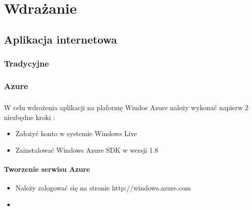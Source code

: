 \chapter{Wdrażanie} %
\label{cha:wdra_anie}

\section{Aplikacja internetowa} %
\label{sec:aplikacja_internetowa}

\subsection{Tradycyjne} %
\label{sub:tradycyjne}


\subsection{Azure} %
\label{sub:azure}
\paragraph{} %
\label{par:}
W celu wdrożenia aplikacji na plaformę Windos Azure należy wykonać napierw 2 niezbędne kroki : 
\begin{itemize}
	\item Założyć konto w systemie Windows Live
	\item Zainstalować Windows Azure SDK w wersji 1.8
\end{itemize}

\subsubsection{Tworzenie serwisu Azure}
\begin{itemize}
	\item Należy zalogować się na stronie http://windows.azure.com
	\item 
\end{itemize}